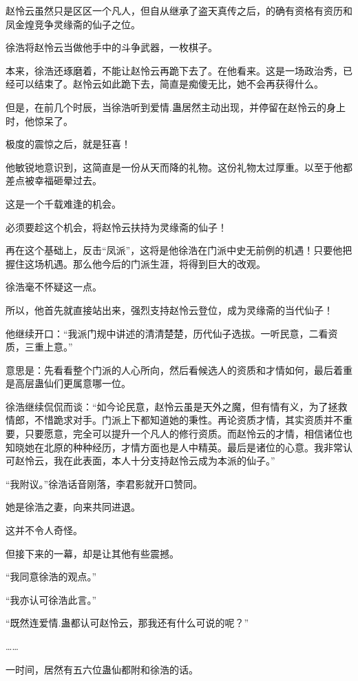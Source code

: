 \begin{this_body}
赵怜云虽然只是区区一个凡人，但自从继承了盗天真传之后，的确有资格有资历和凤金煌竞争灵缘斋的仙子之位。

徐浩将赵怜云当做他手中的斗争武器，一枚棋子。

本来，徐浩还琢磨着，不能让赵怜云再跪下去了。在他看来。这是一场政治秀，已经可以结束了。赵怜云如此跪下去，简直是痴傻无比，她不会再获得什么。

但是，在前几个时辰，当徐浩听到爱情.蛊居然主动出现，并停留在赵怜云的身上时，他惊呆了。

极度的震惊之后，就是狂喜！

他敏锐地意识到，这简直是一份从天而降的礼物。这份礼物太过厚重。以至于他都差点被幸福砸晕过去。

这是一个千载难逢的机会。

必须要趁这个机会，将赵怜云扶持为灵缘斋的仙子！

再在这个基础上，反击“凤派”，这将是他徐浩在门派中史无前例的机遇！只要他把握住这场机遇。那么他今后的门派生涯，将得到巨大的改观。

徐浩毫不怀疑这一点。

所以，他首先就直接站出来，强烈支持赵怜云登位，成为灵缘斋的当代仙子！

他继续开口：“我派门规中讲述的清清楚楚，历代仙子选拔。一听民意，二看资质，三重上意。”

意思是：先看看整个门派的人心所向，然后看候选人的资质和才情如何，最后着重是高层蛊仙们更属意哪一位。

徐浩继续侃侃而谈：“如今论民意，赵怜云虽是天外之魔，但有情有义，为了拯救情郎，不惜跪求对手。门派上下都知道她的秉性。再论资质才情，其实资质并不重要，只要愿意，完全可以提升一个凡人的修行资质。而赵怜云的才情，相信诸位也知晓她在北原的种种经历，才情方面也是人中精英。最后是诸位的心意。我非常认可赵怜云，我在此表面，本人十分支持赵怜云成为本派的仙子。”

“我附议。”徐浩话音刚落，李君影就开口赞同。

她是徐浩之妻，向来共同进退。

这并不令人奇怪。

但接下来的一幕，却是让其他有些震撼。

“我同意徐浩的观点。”

“我亦认可徐浩此言。”

“既然连爱情.蛊都认可赵怜云，那我还有什么可说的呢？”

……

一时间，居然有五六位蛊仙都附和徐浩的话。


\end{this_body}
